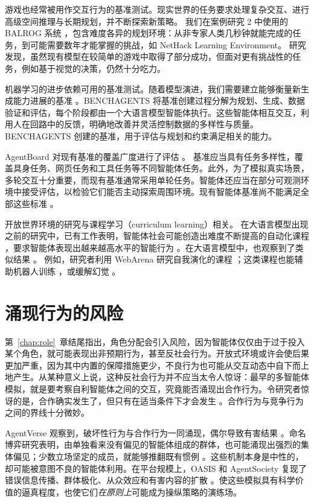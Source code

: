 游戏也经常被用作交互行为的基准测试。现实世界的任务要求处理复杂交互、进行高级空间推理与长期规划，并不断探索新策略。
我们在案例研究 2 中使用的 BALROG 系统 \citep{paglieri2024balrog}，包含难度各异的规划环境：从非专家人类几秒钟就能完成的任务，到可能需要数年才能掌握的挑战，如 NetHack Learning Environment。
研究发现，虽然现有模型在较简单的游戏中取得了部分成功，但面对更有挑战性的任务，例如基于视觉的决策，仍然十分吃力。

机器学习的进步依赖可用的基准测试。随着模型演进，我们需要建立能够衡量新生成能力进展的基准 \citep{butt2024benchagents}。BENCHAGENTS 将基准创建过程分解为规划、生成、数据验证和评估，每个阶段都由一个大语言模型智能体执行。这些智能体相互交互，利用人在回路中的反馈，明确地改善并灵活控制数据的多样性与质量。BENCHAGENTS 创建的基准，用于评估与规划和约束满足相关的能力。

AgentBoard 对现有基准的覆盖广度进行了评估 \citep{ma2024agentboard}。
基准应当具有任务多样性，覆盖具身任务、网页任务和工具任务等不同智能体任务。此外，为了模拟真实场景，多轮交互十分重要，而现有基准通常采用单轮任务。智能体还应当在部分可观测环境中接受评估，以检验它们能否主动探索周围环境。现有智能体基准尚不能满足全部这些标准 \citep{ma2024agentboard}。

开放世界环境的研究与课程学习（curriculum learning）相关。
在大语言模型出现之前的研究中，已有工作表明，智能体社会可能创造出难度不断提高的自动化课程 \citep{elman1991incremental, bengio2009curriculum, silver2017mastering, soviany2022curriculum}，要求智能体表现出越来越高水平的智能行为 \citep{racaniere2019automated}。在大语言模型中，也观察到了类似结果 \citep{feng2023citing}。
例如，研究者利用 WebArena 研究自我演化的课程 \citep{qi2024webrl}；这类课程也能辅助机器人训练 \citep{ryu2024curricullm}，或缓解幻觉 \citep{zhao2024automatic}。

\section{涌现行为的风险}\label{sec:emergentrisk}
第~\ref{chap:role}~章结尾指出，角色分配会引入风险，因为智能体仅仅由于过于投入某个角色，就可能表现出非预期行为，甚至反社会行为。开放式环境或许会使后果更加严重，因为其中内置的保障措施更少，不良行为也可能从交互动态中自下而上地产生。从某种意义上说，这种反社会行为并不应当太令人惊讶：最早的多智能体模拟，就是要考察自利智能体之间的交互，究竟能否涌现出合作行为。令研究者惊讶的是，合作确实发生了，但只有在适当条件下才会发生 \citep{axelrod1981emergence}。合作行为与竞争行为之间的界线十分微妙。

AgentVerse 观察到，破坏性行为与合作行为一同涌现，偶尔导致有害结果 \citep{chen2023agentverse}。命名博弈研究表明，由单独看来没有偏见的智能体组成的群体，也可能涌现出强烈的集体偏见；少数立场坚定的成员，就能够推翻既有惯例 \citep{ashery2024dynamics, kouwenhoven2024searching}。这些机制本身是中性的，却可能被意图不良的智能体利用。在平台规模上，OASIS 和 AgentSociety 复现了错误信息传播、群体极化、从众效应和有害内容的扩散 \citep{yang2024oasis, piao2025polarization}。使这些模拟具有科学价值的逼真程度，也使它们\emph{在原则上}可能成为操纵策略的演练场。


